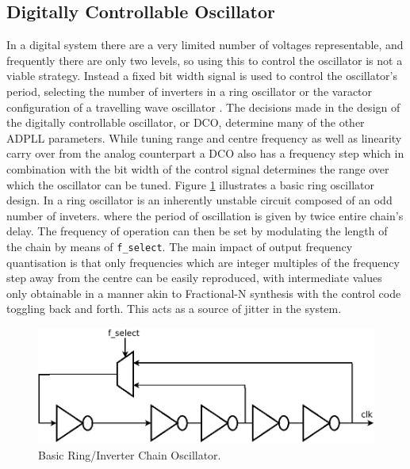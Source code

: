 \documentclass[11pt,english,british]{report}
\begin{document}
\subsection{Digitally Controllable Oscillator}
In a digital system there are a very limited number of voltages representable, and frequently there are only two levels, so using this to control the oscillator is not a viable strategy. Instead a fixed bit width signal is used to control the oscillator's period, selecting the number of inverters in a ring oscillator or the varactor configuration of a travelling wave oscillator \cite{chen2011rotary}. The decisions made in the design of the digitally controllable oscillator, or DCO, determine many of the other ADPLL parameters. While tuning range and centre frequency as well as linearity carry over from the analog counterpart a DCO also has a frequency step which in combination with the bit width of the control signal determines the range over which the oscillator can be tuned. Figure \ref{fig:my_ring} illustrates a basic ring oscillator design. In a ring oscillator is an inherently unstable circuit composed of an odd number of inveters. where the period of oscillation is given by twice entire chain's delay. The frequency of operation can then be set by modulating the length of the chain by means of \texttt{f\_select}. The main impact of output frequency quantisation is that only frequencies which are integer multiples of the frequency step away from the centre can be easily reproduced, with intermediate values only obtainable in a manner akin to Fractional-N synthesis with the control code toggling back and forth. This acts as a source of jitter in the system.
\begin{figure}[h]
	\centering
	\includegraphics[scale=0.35]{../inverter_chain}
	\caption{Basic Ring/Inverter Chain Oscillator.}
	\label{fig:my_ring}
\end{figure}
\end{document}
